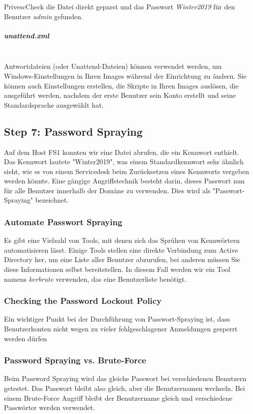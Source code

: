 PrivescCheck die Datei direkt geparst und das Passwort \textcolor{OSTPink}{\textit{Winter2019}} für den Benutzer \textcolor{OSTPink}{\textit{admin}} gefunden.

\subparagraph{unattend.xml}\mbox{} \\
Antwortdateien (oder Unattend-Dateien) können verwendet werden, um Windows-Einstellungen in Ihren Images während der Einrichtung zu ändern. Sie können auch Einstellungen erstellen, die Skripte in Ihren Images auslösen, die ausgeführt werden, nachdem der erste Benutzer sein Konto erstellt und seine Standardsprache ausgewählt hat.

\newpage

\subsection{Step 7: Password Spraying}
Auf dem Host FS1 konnten wir eine Datei abrufen, die ein Kennwort enthielt. Das Kennwort lautete "Winter2019", was einem Standardkennwort sehr ähnlich sieht, wie es von einem Servicedesk beim Zurücksetzen eines Kennworts vergeben werden könnte.
Eine gängige Angriffstechnik besteht darin, dieses Passwort nun für alle Benutzer innerhalb der Domäne zu verwenden. Dies wird als "Passwort-Spraying" bezeichnet.

\subsubsection{Automate Passwort Spraying}
Es gibt eine Vielzahl von Tools, mit denen sich das Sprühen von Kennwörtern automatisieren lässt. Einige Tools stellen eine direkte Verbindung zum Active Directory her, um eine Liste aller Benutzer abzurufen, bei anderen müssen Sie diese Informationen selbst bereitstellen.
In diesem Fall werden wir ein Tool namens \textcolor{OSTPink}{\textit{kerbrute}} verwenden, das eine Benutzerliste benötigt.

\subsubsection{Checking the Password Lockout Policy}
Ein wichtiger Punkt bei der Durchführung von Passwort-Spraying ist, dass Benutzerkonten nicht wegen zu vieler fehlgeschlagener Anmeldungen gesperrt werden dürfen

\subsubsection{Password Spraying vs. Brute-Force}
Beim Password Spraying wird das gleiche Passwort bei verschiedenen Benutzern getestet. Das Passwort bleibt also gleich, aber die Benutzernamen wechseln.
Bei einem Brute-Force Angriff bleibt der Benutzername gleich und verschiedene Passwörter werden verwendet.

